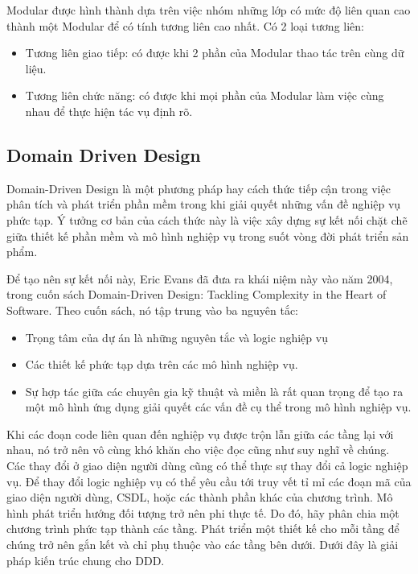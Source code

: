 Modular được hình thành dựa trên việc nhóm những lớp có mức độ liên quan cao thành một Modular để có tính tương liên cao nhất. Có 2 loại tương liên:

\begin{itemize}
	\item Tương liên giao tiếp: có được khi 2 phần của Modular thao tác trên cùng dữ liệu.
	\item Tương liên chức năng: có được khi mọi phần của Modular làm việc cùng nhau để thực hiện tác vụ định rõ.
\end{itemize}

\subsection{Domain Driven Design}

Domain-Driven Design là một phương pháp hay cách thức tiếp cận trong việc phân tích và phát triển phần mềm trong khi giải quyết những vấn đề nghiệp vụ phức tạp. Ý tưởng cơ bản của cách thức này là việc xây dựng sự kết nối chặt chẽ giữa thiết kế phần mềm và mô hình nghiệp vụ trong suốt vòng đời phát triển sản phẩm. 

Để tạo nên sự kết nối này, Eric Evans đã đưa ra khái niệm này vào năm 2004, trong cuốn sách Domain-Driven Design: Tackling Complexity in the Heart of Software. Theo cuốn sách, nó tập trung vào ba nguyên tắc:

\begin{itemize}
	\item Trọng tâm của dự án là những nguyên tắc và logic nghiệp vụ
	\item Các thiết kế phức tạp dựa trên các mô hình nghiệp vụ.
	\item Sự hợp tác giữa các chuyên gia kỹ thuật và miền là rất quan trọng để tạo ra một mô hình ứng dụng giải quyết các vấn đề cụ thể trong mô hình nghiệp vụ.
\end{itemize}

Khi các đoạn code liên quan đến nghiệp vụ được trộn lẫn giữa các tầng lại với nhau, nó trở nên vô cùng khó khăn cho việc đọc cũng như suy nghĩ về chúng. Các thay đổi ở giao diện người dùng cũng có thể thực sự thay đổi cả logic nghiệp vụ. Để thay đổi logic nghiệp vụ có thể yêu cầu tới truy vết tỉ mỉ các đoạn mã của giao diện người dùng, CSDL, hoặc các thành phần khác của chương trình. Mô hình phát triển hướng đối tượng trở nên phi thực tế. Do đó, hãy phân chia một chương trình phức tạp thành các tầng. Phát triển một thiết kế cho mỗi tầng để chúng trở nên gắn kết và chỉ phụ thuộc vào các tầng bên dưới. Dưới đây là giải pháp kiến trúc chung cho DDD.

